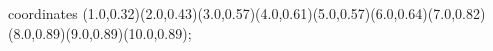 					coordinates { (1.0,0.32)(2.0,0.43)(3.0,0.57)(4.0,0.61)(5.0,0.57)(6.0,0.64)(7.0,0.82)(8.0,0.89)(9.0,0.89)(10.0,0.89)};